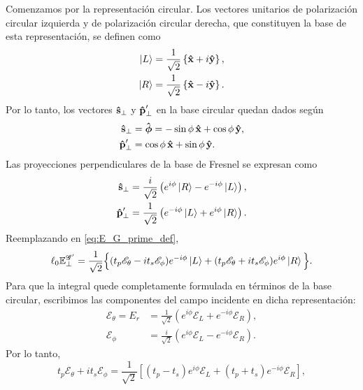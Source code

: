 Comenzamos por la representación circular. Los vectores unitarios de polarización circular izquierda y de polarización circular derecha, que constituyen la base de esta representación, se definen como
\begin{equation}
\begin{aligned}
  \ket L
  &=
  \frac{1}{\sqrt 2}
  \left\{
  \bm{\hat{\mathbf{x}}} + i \bm{\hat{\mathbf{y}}}
  \right\},
  \\
  \ket R
  &=
  \frac{1}{\sqrt 2}
  \left\{
  \bm{\hat{\mathbf{x}}} - i \bm{\hat{\mathbf{y}}}
  \right\}.
  \label{eq:def_of_circular_basis}
\end{aligned}
\end{equation}
Por lo tanto, los vectores $\bm{\hat{\mathbf{s}}}_\perp$ y $\bm{\hat{\mathbf{p}}}'_\perp$ en la base circular quedan dados según
\begin{align}
\bm{\hat{\mathbf{s}}}_\perp
&=
\bm{\hat{\mathbf{\phi}}}
=
-\sin\phi\,\bm{\hat{\mathbf{x}}}
+
\cos\phi\,\bm{\hat{\mathbf{y}}},
\\
\bm{\hat{\mathbf{p}}}'_\perp
&=
\cos\phi\,\bm{\hat{\mathbf{x}}}
+
\sin\phi\,\bm{\hat{\mathbf{y}}}.
\end{align}
Las proyecciones perpendiculares de la base de Fresnel se expresan como
\begin{align}
\bm{\hat{\mathbf{s}}}_\perp
&=
\frac{i}{\sqrt{2}}
\left(
e^{i\phi}\ket{R}
-
e^{-i\phi}\ket{L}
\right),
\\
\bm{\hat{\mathbf{p}}}'_\perp
&=
\frac{1}{\sqrt{2}}
\left(
e^{-i\phi}\ket{L}
+
e^{i\phi}\ket{R}
\right).
\end{align}
Reemplazando en \eqref{eq:E_G_prime_def},
\begin{equation}
  \ell_0 \mathbb{E}^{\mathscr G'}_\perp
=
\frac{1}{\sqrt{2}}
\Big\{
(t_p \mathscr E_\theta - i t_s \mathscr E_\phi)e^{-i\phi}\ket{L}
+
(t_p \mathscr E_\theta + i t_s \mathscr E_\phi)e^{i\phi}\ket{R}
\Big\}.
\end{equation}
Para que la integral quede completamente formulada en términos de la base circular, escribimos las componentes del campo incidente en dicha representación:
\begin{align}
\mathscr E_\theta
=
E_r
&=
\frac{1}{\sqrt{2}}
\left(
e^{i\phi}\mathscr E_L
+
e^{-i\phi}\mathscr E_R
\right),
\label{eq:Ep_in_LR_basis}
\\
\mathscr E_\phi
&=
\frac{i}{\sqrt{2}}
\left(
e^{i\phi}\mathscr E_L
-
e^{-i\phi}\mathscr E_R
\right).
\label{eq:Ephi_in_LR_basis}
\end{align}
Por lo tanto,
\begin{equation}
t_p\mathscr E_\theta+i t_s\mathscr E_\phi
=
\frac{1}{\sqrt2}
\left[
(t_p-t_s)e^{i\phi}\mathscr E_L
+
(t_p+t_s)e^{-i\phi}\mathscr E_R
\right],
\end{equation}
